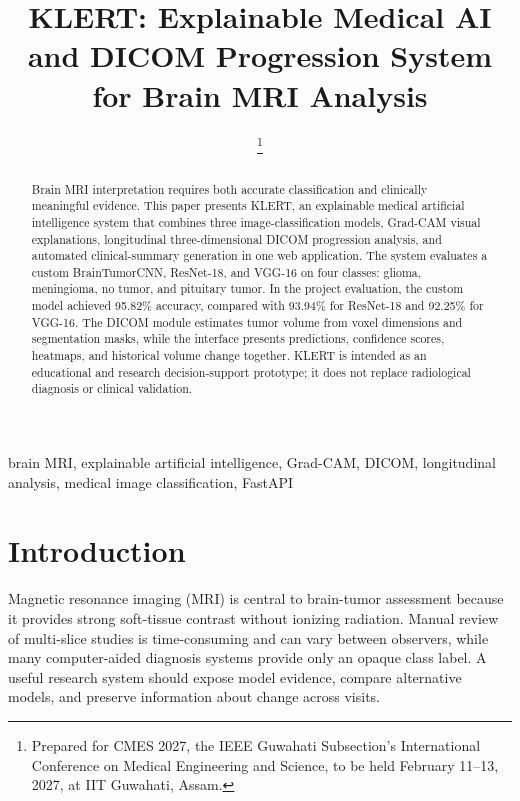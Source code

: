 \documentclass[conference]{IEEEtran}
\title{KLERT: Explainable Medical AI and DICOM Progression System for Brain MRI Analysis}
\author{
\IEEEauthorblockN{Anandita Indurkhya}
\IEEEauthorblockA{
Department of Computer Science and Engineering (AIML)\\
Shri Shankaracharya Institute of Professional Management and Technology, Raipur, India}
\thanks{Prepared for CMES 2027, the IEEE Guwahati Subsection's International Conference on Medical Engineering and Science, to be held February 11--13, 2027, at IIT Guwahati, Assam.}
}
\begin{document}
\maketitle

\begin{abstract}
Brain MRI interpretation requires both accurate classification and clinically meaningful evidence. This paper presents KLERT, an explainable medical artificial intelligence system that combines three image-classification models, Grad-CAM visual explanations, longitudinal three-dimensional DICOM progression analysis, and automated clinical-summary generation in one web application. The system evaluates a custom BrainTumorCNN, ResNet-18, and VGG-16 on four classes: glioma, meningioma, no tumor, and pituitary tumor. In the project evaluation, the custom model achieved 95.82\% accuracy, compared with 93.94\% for ResNet-18 and 92.25\% for VGG-16. The DICOM module estimates tumor volume from voxel dimensions and segmentation masks, while the interface presents predictions, confidence scores, heatmaps, and historical volume change together. KLERT is intended as an educational and research decision-support prototype; it does not replace radiological diagnosis or clinical validation.
\end{abstract}

\begin{IEEEkeywords}
brain MRI, explainable artificial intelligence, Grad-CAM, DICOM, longitudinal analysis, medical image classification, FastAPI
\end{IEEEkeywords}

\section{Introduction}
Magnetic resonance imaging (MRI) is central to brain-tumor assessment because it provides strong soft-tissue contrast without ionizing radiation. Manual review of multi-slice studies is time-consuming and can vary between observers, while many computer-aided diagnosis systems provide only an opaque class label. A useful research system should expose model evidence, compare alternative models, and preserve information about change across visits.
\end{document}
